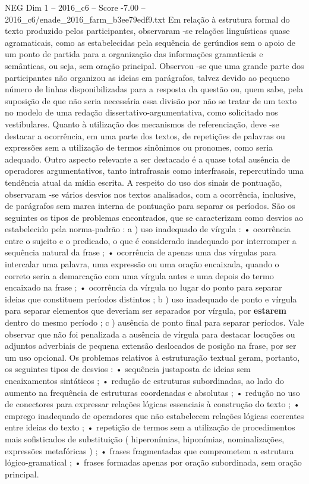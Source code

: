 \begin{textsample}{NEG Dim 1 – 2016\_c6 – Score -7.00 – 2016\_c6/enade\_2016\_farm\_b3ee79edf9.txt}
Em relação à estrutura formal do texto produzido pelos participantes, observaram -se relações linguísticas quase agramaticais, como as estabelecidas pela sequência de gerúndios sem o apoio de um ponto de partida para a organização das informações gramaticais e semânticas, ou seja, sem oração principal.
Observou -se que uma grande parte dos participantes não organizou as ideias em parágrafos, talvez devido ao pequeno número de linhas disponibilizadas para a resposta da questão ou, quem sabe, pela suposição de que não seria necessária essa divisão por não se tratar de um texto no modelo de uma redação dissertativo-argumentativa, como solicitado nos vestibulares.
Quanto à utilização dos mecanismos de referenciação, deve -se destacar a ocorrência, em uma parte dos textos, de repetições de palavras ou expressões sem a utilização de termos sinônimos ou pronomes, como seria adequado.
Outro aspecto relevante a ser destacado é a quase total ausência de operadores argumentativos, tanto intrafrasais como interfrasais, repercutindo uma tendência atual da mídia escrita.
A respeito do uso dos sinais de pontuação, observaram -se vários desvios nos textos analisados, com a ocorrência, inclusive, de parágrafos sem marca interna de pontuação para separar os períodos.
São os seguintes os tipos de problemas encontrados, que se caracterizam como desvios ao estabelecido pela norma-padrão : a ) uso inadequado de vírgula : • ocorrência entre o sujeito e o predicado, o que é considerado inadequado por interromper a sequência natural da frase ; • ocorrência de apenas uma das vírgulas para intercalar uma palavra, uma expressão ou uma oração encaixada, quando o correto seria a demarcação com uma vírgula antes e uma depois do termo encaixado na frase ; • ocorrência da vírgula no lugar do ponto para separar ideias que constituem períodos distintos ; b ) uso inadequado de ponto e vírgula para separar elementos que deveriam ser separados por vírgula, por \textbf{estarem} dentro do mesmo período ; c ) ausência de ponto final para separar períodos.
Vale observar que não foi penalizada a ausência de vírgula para destacar locuções ou adjuntos adverbiais de pequena extensão deslocados de posição na frase, por ser um uso opcional.
Os problemas relativos à estruturação textual geram, portanto, os seguintes tipos de desvios : • sequência justaposta de ideias sem encaixamentos sintáticos ; • redução de estruturas subordinadas, ao lado do aumento na frequência de estruturas coordenadas e absolutas ; • redução no uso de conectores para expressar relações lógicas essenciais à construção do texto ; • emprego inadequado de operadores que não estabelecem relações lógicas coerentes entre ideias do texto ; • repetição de termos sem a utilização de procedimentos mais sofisticados de substituição ( hiperonímias, hiponímias, nominalizações, expressões metafóricas ) ; • frases fragmentadas que comprometem a estrutura lógico-gramatical ; • frases formadas apenas por oração subordinada, sem oração principal.

\end{textsample}
